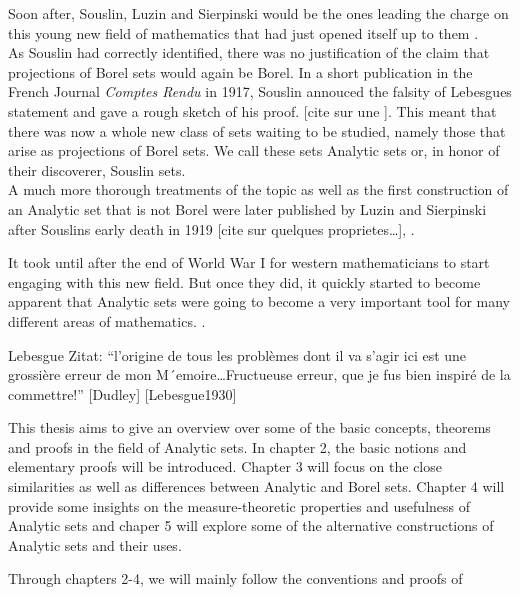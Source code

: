 \documentclass[10pt, a4paper, titlepage]{article}
\numberwithin{equation}{section}
\begin{document}
Soon after, Souslin, Luzin and Sierpinski would be the ones leading the charge on this young new field of mathematics that had just opened itself up to them \cite{rogers1980}. \\
As Souslin had correctly identified, there was no justification of the claim that projections of Borel sets would again be Borel.
In a short publication in the French Journal \textit{Comptes Rendu} in 1917, Souslin annouced the falsity of Lebesgues statement and gave a rough sketch of his proof. [cite sur une ].
This meant that there was now a whole new class of sets waiting to be studied, namely those that arise as projections of Borel sets. We call these sets Analytic sets or, in honor of their discoverer, Souslin sets.\\
A much more thorough treatments of the topic as well as the first construction of an Analytic set that is not Borel were later published by Luzin and Sierpinski after Souslins early death in 1919 [cite sur quelques proprietes\ldots], \cite{lusin1923} \cite{lusin1927}.

It took until after the end of World War I for western mathematicians to start engaging with this new field. 
But once they did, it quickly started to become apparent that Analytic sets were going to become a very important tool for many different areas of mathematics. \cite{Moschovakis1987} \cite{rogers1980}.

Lebesgue Zitat:
``l’origine de tous les problèmes dont il va s’agir ici est une
grossière erreur de mon M´emoire\ldots Fructueuse erreur, que je fus bien inspiré de la
commettre!'' [Dudley] [Lebesgue1930]

This thesis aims to give an overview over some of the basic concepts, theorems and proofs in the field of Analytic sets. 
In chapter 2, the basic notions and elementary proofs will be introduced. Chapter 3 will focus on the close similarities as well as differences between Analytic and Borel sets. Chapter 4 will provide some insights on the measure-theoretic properties and usefulness of Analytic sets and chaper 5 will explore some of the alternative constructions of Analytic sets and their uses. 

Through chapters 2-4, we will mainly follow the conventions and proofs of \cite{cohn2013}



\end{document}
